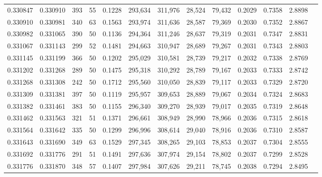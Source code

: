 \begin{tabular}{rrrrrrrrrrrrr}
0.330847 & 0.330910 &   393 &  55 &                                     0.1228 & 293,634 & 311,976 &  28,524 &  79,432 & 0.2029 & 0.7358 & 2.8898 \\
0.330910 & 0.330981 &   340 &  63 &                                     0.1563 & 293,974 & 311,636 &  28,587 &  79,369 & 0.2030 & 0.7352 & 2.8867 \\
0.330982 & 0.331065 &   390 &  50 &                                     0.1136 & 294,364 & 311,246 &  28,637 &  79,319 & 0.2031 & 0.7347 & 2.8831 \\
0.331067 & 0.331143 &   299 &  52 &                                     0.1481 & 294,663 & 310,947 &  28,689 &  79,267 & 0.2031 & 0.7343 & 2.8803 \\
0.331145 & 0.331199 &   366 &  50 &                                     0.1202 & 295,029 & 310,581 &  28,739 &  79,217 & 0.2032 & 0.7338 & 2.8769 \\
0.331202 & 0.331268 &   289 &  50 &                                     0.1475 & 295,318 & 310,292 &  28,789 &  79,167 & 0.2033 & 0.7333 & 2.8742 \\
0.331268 & 0.331308 &   242 &  50 &                                     0.1712 & 295,560 & 310,050 &  28,839 &  79,117 & 0.2033 & 0.7329 & 2.8720 \\
0.331309 & 0.331381 &   397 &  50 &                                     0.1119 & 295,957 & 309,653 &  28,889 &  79,067 & 0.2034 & 0.7324 & 2.8683 \\
0.331382 & 0.331461 &   383 &  50 &                                     0.1155 & 296,340 & 309,270 &  28,939 &  79,017 & 0.2035 & 0.7319 & 2.8648 \\
0.331462 & 0.331563 &   321 &  51 &                                     0.1371 & 296,661 & 308,949 &  28,990 &  78,966 & 0.2036 & 0.7315 & 2.8618 \\
0.331564 & 0.331642 &   335 &  50 &                                     0.1299 & 296,996 & 308,614 &  29,040 &  78,916 & 0.2036 & 0.7310 & 2.8587 \\
0.331643 & 0.331690 &   349 &  63 &                                     0.1529 & 297,345 & 308,265 &  29,103 &  78,853 & 0.2037 & 0.7304 & 2.8555 \\
0.331692 & 0.331776 &   291 &  51 &                                     0.1491 & 297,636 & 307,974 &  29,154 &  78,802 & 0.2037 & 0.7299 & 2.8528 \\
0.331776 & 0.331870 &   348 &  57 &                                     0.1407 & 297,984 & 307,626 &  29,211 &  78,745 & 0.2038 & 0.7294 & 2.8495 \\

\end{tabular}
